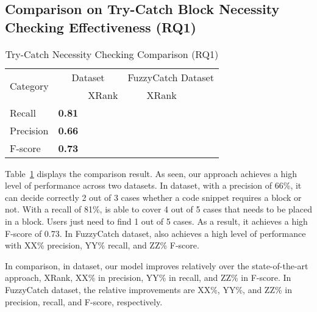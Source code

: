 \subsection{Comparison on Try-Catch Block Necessity Checking Effectiveness (RQ1)}
\label{sec:rq1}

\begin{table}[t]
  \caption{Try-Catch Necessity Checking Comparison (RQ1)}
  \vspace{-12pt}
	\begin{center}
		\renewcommand{\arraystretch}{1}
		\begin{tabular}{p{1.5cm}<{\centering}|p{1.25cm}<{\centering}p{1.25cm}<{\centering}|p{1.25cm}<{\centering}p{1.25cm}<{\centering}}
			\hline
			\multirow{2}{*}{Category} & \multicolumn{2}{c|}{{\tool} Dataset} & \multicolumn{2}{c}{FuzzyCatch Dataset}\\
			\cline{2-5}
			  & \tool  & XRank & \tool  & XRank\\
			\hline
			Recall    & \textbf{0.81} & &&\\
			Precision & \textbf{0.66} & &&\\
			F-score   & \textbf{0.73} & &&\\
			\hline
		\end{tabular}
		\label{tab:xblock}
	\end{center}
\end{table}


Table~\ref{tab:xblock} displays the comparison result. As seen, our
approach achieves a high level of performance across two datasets. In
{\tool} dataset, with a precision of 66\%, it can decide correctly 2
out of 3 cases whether a code snippet requires a 
block or not. With a recall of 81\%, {\tool} is able to cover 4 out of
5 cases that needs to be placed in a  block. Users
just need to find 1 out of 5 cases. As a result, it achieves a high
F-score of 0.73. In FuzzyCatch dataset, {\tool} also achieves a high
level of performance with XX\% precision, YY\% recall, and ZZ\%
F-score.

In comparison, in {\tool} dataset, our model improves relatively over
the state-of-the-art approach, XRank, XX\% in precision, YY\% in
recall, and ZZ\% in F-score. In FuzzyCatch dataset, the relative
improvements are XX\%, YY\%, and ZZ\% in precision, recall, and
F-score, respectively.

